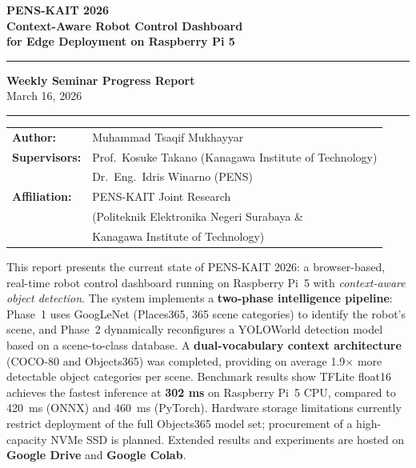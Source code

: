 \documentclass[12pt,a4paper]{article}
\begin{document}
\begin{titlepage}
  \centering
  \vspace*{1.5cm}

  {\LARGE\bfseries\color{primary}
   PENS-KAIT 2026\\[0.4em]
   \large Context-Aware Robot Control Dashboard\\[0.2em]
   for Edge Deployment on Raspberry Pi 5}

  \vspace{0.8cm}
  \rule{\linewidth}{1.5pt}
  \vspace{0.4cm}

  {\large\bfseries Weekly Seminar Progress Report}\\[0.3em]
  {\normalsize March 16, 2026}

  \vspace{0.8cm}
  \rule{\linewidth}{0.4pt}
  \vspace{0.6cm}

  \begin{tabular}{ll}
    \textbf{Author:}     & Muhammad Tsaqif Mukhayyar \\[0.2em]
    \textbf{Supervisors:}& Prof.\ Kosuke Takano (Kanagawa Institute of Technology) \\
                         & Dr.\ Eng.\ Idris Winarno (PENS) \\[0.2em]
    \textbf{Affiliation:}& PENS-KAIT Joint Research \\
                         & (Politeknik Elektronika Negeri Surabaya \& \\
                         & \phantom{(}Kanagawa Institute of Technology) \\
  \end{tabular}

  \vspace{1.2cm}

  \begin{tcolorbox}[colback=primary!8, colframe=primary,
      title=\textbf{Abstract}, fonttitle=\bfseries]
    \small
    This report presents the current state of PENS-KAIT 2026: a browser-based,
    real-time robot control dashboard running on Raspberry Pi~5 with
    \textit{context-aware object detection}. The system implements a
    \textbf{two-phase intelligence pipeline}: Phase~1 uses GoogLeNet
    (Places365, 365 scene categories) to identify the robot's scene, and
    Phase~2 dynamically reconfigures a YOLOWorld detection model based on a
    scene-to-class database. A \textbf{dual-vocabulary context architecture}
    (COCO-80 and Objects365) was completed, providing on average 1.9$\times$
    more detectable object categories per scene. Benchmark results show
    TFLite float16 achieves the fastest inference at \textbf{302 ms} on
    Raspberry Pi~5 CPU, compared to 420~ms (ONNX) and 460~ms (PyTorch).
    Hardware storage limitations currently restrict deployment of the full
    Objects365 model set; procurement of a high-capacity NVMe SSD is planned.
    Extended results and experiments are hosted on \textbf{Google Drive} and
    \textbf{Google Colab}.
  \end{tcolorbox}


\end{titlepage}
\end{document}
